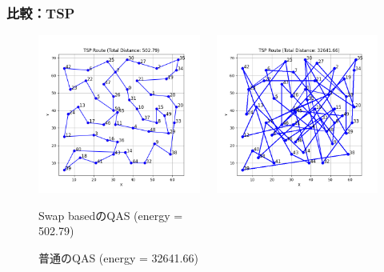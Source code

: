 \begin{frame}
  \frametitle{比較：TSP}
  \begin{figure}
    \begin{columns}
      \begin{column}{0.47\linewidth}
        \includegraphics[width=1\linewidth]{data/TSP_graph.png}
        \caption{Swap basedのQAS (energy = 502.79)}        
      \end{column}
      \begin{column}{0.47\linewidth}
        \includegraphics[width=1\linewidth]{data/TSP_broken.png}
        \caption{普通のQAS (energy = 32641.66)}
      \end{column}
    \end{columns}
  \end{figure}
\end{frame}

